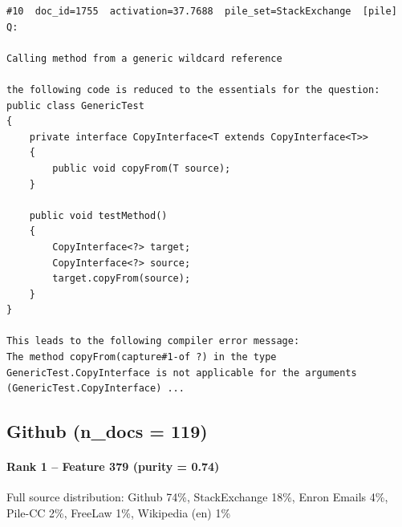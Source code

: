 \begin{verbatim}
#10  doc_id=1755  activation=37.7688  pile_set=StackExchange  [pile]
Q:

Calling method from a generic wildcard reference

the following code is reduced to the essentials for the question:
public class GenericTest 
{
    private interface CopyInterface<T extends CopyInterface<T>>
    {
        public void copyFrom(T source);
    }

    public void testMethod()
    {
        CopyInterface<?> target;
        CopyInterface<?> source;
        target.copyFrom(source);
    }
}

This leads to the following compiler error message:
The method copyFrom(capture#1-of ?) in the type GenericTest.CopyInterface is not applicable for the arguments (GenericTest.CopyInterface) ...

\end{verbatim}

\subsection*{Github (n\_docs = 119)}

\paragraph*{Rank 1 -- Feature 379 (purity = 0.74)}

Full source distribution: Github 74\%, StackExchange 18\%, Enron Emails 4\%, Pile-CC 2\%, FreeLaw 1\%, Wikipedia (en) 1\%

